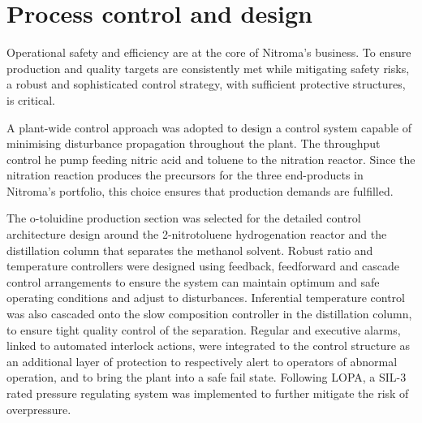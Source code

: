 \section*{Process control and design}

Operational safety and efficiency are at the core of Nitroma's business. To ensure production and quality targets are consistently met while mitigating safety risks, a robust and sophisticated control strategy, with sufficient protective structures, is critical.

A plant-wide control approach was adopted to design a control system capable of minimising disturbance propagation throughout the plant.  The throughput control he pump feeding nitric acid and toluene to the nitration reactor. Since the nitration reaction produces the precursors for the three end-products in Nitroma's portfolio, this choice ensures that production demands are fulfilled.   


The o-toluidine production section was selected for the detailed control architecture design around the 2-nitrotoluene hydrogenation reactor and the distillation column that separates the methanol solvent. Robust ratio and temperature controllers were designed using feedback, feedforward and cascade control arrangements to ensure the system can maintain optimum and safe operating conditions and adjust to disturbances. Inferential temperature control was also cascaded onto the slow composition controller in the distillation column, to ensure tight quality control of the separation. 
Regular and executive alarms, linked to automated interlock actions, were integrated to the control structure as an additional layer of protection to respectively alert to operators of abnormal operation, and to bring the plant into a safe fail state. Following LOPA, a SIL-3 rated pressure regulating system was implemented to further mitigate the risk of overpressure.




